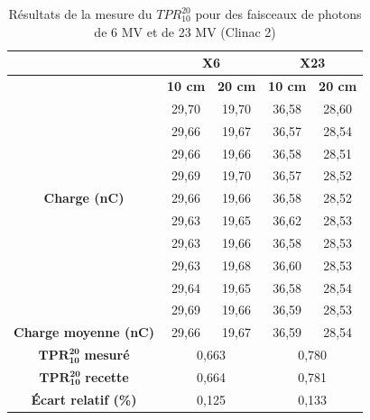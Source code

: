 \documentclass{article}
\begin{document}
\begin{table}[h!]
  \centering
  \begin{tabular}{c|cc|cc|}
  \cline{2-5}
                                                                                     & \multicolumn{2}{c|}{\textbf{X6}} & \multicolumn{2}{c|}{\textbf{X23}} \\ \hline
  \multicolumn{1}{|c|}{\multirow{11}{*}{\textbf{Charge (nC)}}}                      & \textbf{10 cm}           & \textbf{20 cm}          & \textbf{10 cm}           & \textbf{20 cm}           \\ \cline{2-5} 
  \multicolumn{1}{|c|}{} & 29,70 & 19,70 & 36,58 & 28,60 \\
  \multicolumn{1}{|c|}{} & 29,66 & 19,67 & 36,57 & 28,54 \\
  \multicolumn{1}{|c|}{} & 29,66 & 19,66 & 36,58 & 28,51 \\
  \multicolumn{1}{|c|}{} & 29,69 & 19,70 & 36,57 & 28,52 \\
  \multicolumn{1}{|c|}{} & 29,66 & 19,66 & 36,58 & 28,52 \\
  \multicolumn{1}{|c|}{} & 29,63 & 19,65 & 36,62 & 28,53 \\
  \multicolumn{1}{|c|}{} & 29,63 & 19,66 & 36,58 & 28,53 \\
  \multicolumn{1}{|c|}{} & 29,63 & 19,68 & 36,60 & 28,53 \\
  \multicolumn{1}{|c|}{} & 29,64 & 19,65 & 36,58 & 28,54 \\
  \multicolumn{1}{|c|}{} & 29,69 & 19,66 & 36,59 & 28,53 \\
  \hline
  \multicolumn{1}{|c|}{\textbf{Charge moyenne   (nC)}}                               & 29,66           & 19,67          & 36,59           & 28,54           \\
  \hline
  \multicolumn{1}{|c|}{$\mathbf{TPR^{20}_{10}}$ \textbf{mesuré}}  & \multicolumn{2}{c|}{0,663}       & \multicolumn{2}{c|}{0,780}        \\
  \multicolumn{1}{|c|}{$\mathbf{TPR^{20}_{10}}$ \textbf{recette}} & \multicolumn{2}{c|}{0,664}       & \multicolumn{2}{c|}{0,781}        \\
  \multicolumn{1}{|c|}{\textbf{Écart relatif (\%)}}                                           & \multicolumn{2}{c|}{0,125}       & \multicolumn{2}{c|}{0,133}        \\ \hline
  \end{tabular}
  \caption{Résultats de la mesure du $TPR^{20}_{10}$ pour des faisceaux de photons de 6 MV et de 23 MV (Clinac 2)}
  \label{table_resultats_tpr}
\end{table}
\end{document}
